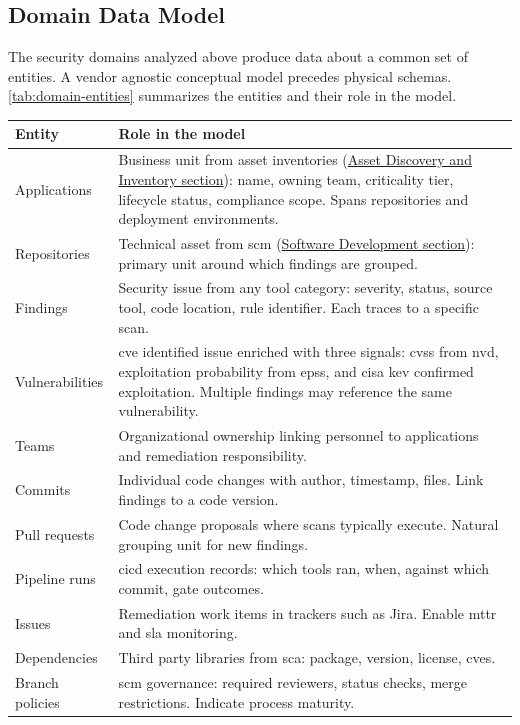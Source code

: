 
\subsection{Domain Data Model}
\label{sec:data-entities}

The security domains analyzed above produce data about a common set of entities. A vendor agnostic conceptual model precedes physical schemas. \autoref{tab:domain-entities} summarizes the entities and their role in the model.

\begin{center}
\begin{minipage}{\textwidth}
\label{tab:domain-entities}
\begin{tabularx}{\textwidth}{l X}
\toprule
\textbf{Entity} & \textbf{Role in the model} \\
\midrule
Applications     & Business unit from asset inventories (\hyperref[sec:app-inventory]{Asset Discovery and Inventory section}): name, owning team, criticality tier, lifecycle status, compliance scope. Spans repositories and deployment environments. \\
Repositories     & Technical asset from \gls{scm} (\hyperref[sec:sw-dev-analysis]{Software Development section}): primary unit around which findings are grouped. \\
Findings         & Security issue from any tool category: severity, status, source tool, code location, rule identifier. Each traces to a specific scan. \\
Vulnerabilities  & \gls{cve} identified issue enriched with three signals: \gls{cvss} from \gls{nvd}, exploitation probability from \gls{epss}, and \gls{cisa} \gls{kev} confirmed exploitation. Multiple findings may reference the same vulnerability. \\
Teams            & Organizational ownership linking personnel to applications and remediation responsibility. \\
Commits          & Individual code changes with author, timestamp, files. Link findings to a code version. \\
Pull requests    & Code change proposals where scans typically execute. Natural grouping unit for new findings. \\
Pipeline runs    & \gls{cicd} execution records: which tools ran, when, against which commit, gate outcomes. \\
Issues           & Remediation work items in trackers such as Jira. Enable \gls{mttr} and \gls{sla} monitoring. \\
Dependencies     & Third party libraries from \gls{sca}: package, version, license, \glspl{cve}. \\
Branch policies  & \gls{scm} governance: required reviewers, status checks, merge restrictions. Indicate process maturity. \\
\bottomrule
\end{tabularx}
\end{minipage}
\end{center}

